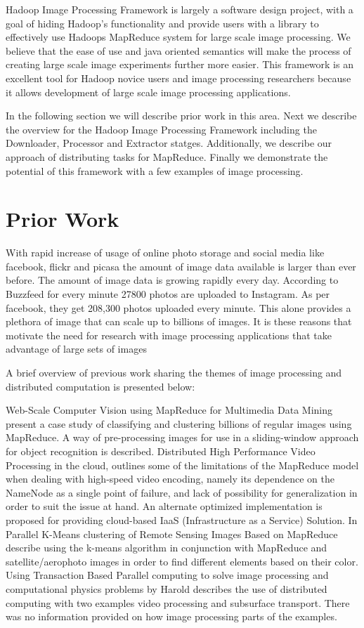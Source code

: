 \documentclass[conference]{IEEEtran}
\begin{document}
	Hadoop Image Processing Framework is largely a software design project, with a goal of hiding Hadoop's functionality and provide users with a library to effectively use Hadoops MapReduce system for large scale image processing. We believe that the ease of use and java oriented semantics will make the process of creating large scale image experiments further more easier. This framework is an excellent tool for Hadoop novice users and image processing researchers because it allows development of large scale image processing applications.
	
	In the following section  we will describe prior work in this area. Next we describe the overview for the Hadoop Image Processing Framework including the Downloader, Processor and Extractor statges. Additionally, we describe our approach of distributing tasks for MapReduce. Finally we demonstrate the potential of this framework with a few examples of image processing.
	
	\section{Prior Work}
	With rapid increase of usage of online photo storage and social media like facebook, flickr and picasa the amount of image data available is larger than ever before. The amount of image data is growing rapidly every day. According to Buzzfeed for every minute 27800 photos are uploaded to Instagram. As per facebook, they get 208,300 photos uploaded every minute\cite{Horaczek2013}. This alone provides a plethora of image that can scale up to billions of images. It is these reasons that motivate the need for research with image processing applications that take advantage of large sets of images
	
	A brief overview of previous work sharing the themes of image processing and distributed computation is presented below:
	
	Web-Scale Computer Vision using MapReduce for Multimedia Data Mining \cite{White2010} present a case study of classifying and clustering billions of regular images using MapReduce. A way of pre-processing images for use in a sliding-window approach for object recognition is described. Distributed High Performance Video Processing in the cloud, outlines some of the limitations of the MapReduce model when dealing with high-speed video encoding, namely its dependence on the NameNode as a single point of failure, and lack of possibility for generalization in order to suit the issue at hand. An alternate optimized implementation is proposed for providing cloud-based IaaS (Infrastructure as a Service) Solution. In Parallel K-Means clustering of Remote Sensing Images Based on MapReduce \cite{Lv2010} describe using the k-means algorithm in conjunction with MapReduce and satellite/aerophoto images in order to find different elements based on their color. Using Transaction Based Parallel computing to solve image processing and computational physics problems by Harold describes the use of distributed computing with two examples video processing and subsurface transport. There was no information provided on how image processing parts of the examples. 
	
\end{document}
